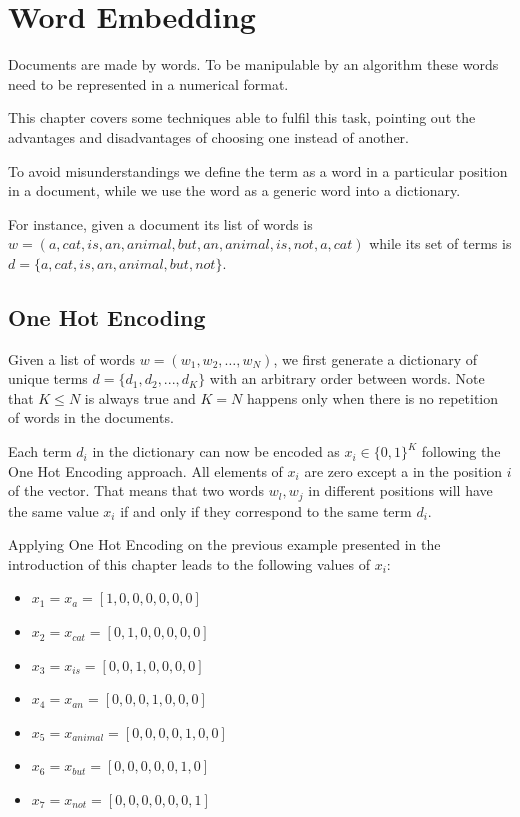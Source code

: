 \chapter{Word Embedding} \label{wordemb}
Documents are made by words.
To be manipulable by an algorithm these words need to be represented in a numerical format.

This chapter covers some techniques able to fulfil this task,
pointing out the advantages and disadvantages of choosing one instead of another.

To avoid misunderstandings
we define the term  as a word in a particular position in a document,
while we use the word  as a generic word into a dictionary.

For instance, given a document  its list of words
is $ w = (a, cat, is, an, animal, but, an, animal, is, not, a, cat)$
while its set of terms is $d = \{a, cat, is, an, animal, but, not\}$.

\section{One Hot Encoding}
Given a list of words $w = (w_1, w_2, \dots, w_N)$,
we first generate a dictionary of unique terms
$d = \{d_1, d_2, ..., d_K\}$ with an arbitrary order between words.
Note that $ K \leq N $ is always true and $ K = N $ happens only when there is no repetition of words in the documents.

Each term $d_i$ in the dictionary can now be encoded as $x_i \in \{0,1\}^K$ following the One Hot Encoding approach.
All elements of $x_i$ are zero except a  in the position  $i$ of the vector.
That means that two words $w_l, w_j$ in different positions will have the same value $x_i$ if and only if they correspond to the same term $d_i$.

Applying One Hot Encoding on the previous example presented in the introduction of this chapter leads to the following values of $x_i$:
\begin{multicols}{2}
    \begin{itemize}
        \item $x_1 = x_{a} = [1, 0, 0, 0, 0, 0, 0]$
        \item $x_2 = x_{cat} = [0, 1, 0, 0, 0, 0, 0]$
        \item $x_3 = x_{is} = [0, 0, 1, 0, 0, 0, 0]$
        \item $x_4 = x_{an} = [0, 0, 0, 1, 0, 0, 0]$
        \item $x_5 = x_{animal} = [0, 0, 0, 0, 1, 0, 0]$
        \item $x_6 = x_{but} = [0, 0, 0, 0, 0, 1, 0]$
        \item $x_7 = x_{not} = [0, 0, 0, 0, 0, 0, 1]$
    \end{itemize}
\end{multicols}

